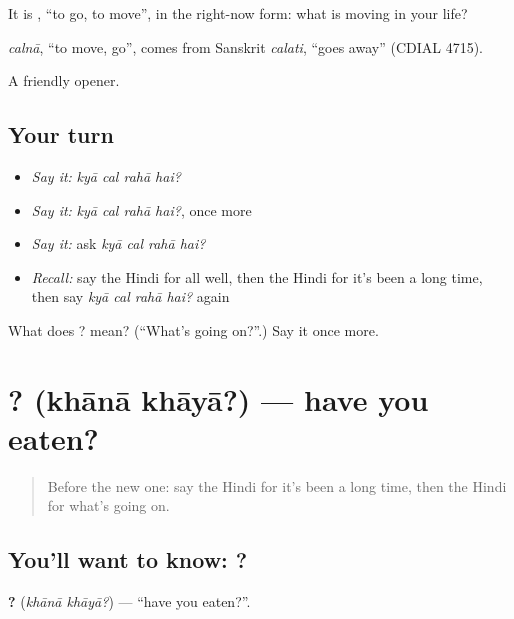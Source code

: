 It is \textbf{}, \textquotedblleft{}to go, to move\textquotedblright{}, in the right-now form: what is moving in your life?

\begin{cousinweb}
\emph{calnā}, \textquotedblleft{}to move, go\textquotedblright{}, comes from Sanskrit \emph{calati}, \textquotedblleft{}goes away\textquotedblright{} (CDIAL 4715).
\end{cousinweb}

\begin{grammarlens}[title={What you've built}]
A friendly opener.
\end{grammarlens}

\subsection*{Your turn}
\begin{itemize}
\raggedright
  \item \emph{Say it:} \emph{kyā cal rahā hai?}
  \item \emph{Say it:} \emph{kyā cal rahā hai?}, once more
  \item \emph{Say it:} ask \emph{kyā cal rahā hai?}
  \item \emph{Recall:} say the Hindi for all well, then the Hindi for it's been a long time, then say \emph{kyā cal rahā hai?} again
\end{itemize}

\begin{tcolorbox}[breakable,colback=teal!4,colframe=teal!35!black,title={Before you move on}]
What does    ? mean? (\textquotedblleft{}What's going on?\textquotedblright{}.) Say it once more.
\end{tcolorbox}
\section[\texorpdfstring{\hi{खाना} \hi{खाया}? (khānā khāyā?)}{खाना खाया? (khānā khāyā?)}]{ ? (khānā khāyā?) — have you eaten?}

\label{lesson:HI-C123-khanakhaya}



\begin{quote}
Before the new one: say the Hindi for it's been a long time, then the Hindi for what's going on.
\end{quote}

\subsection*{You'll want to know:  ?}
\textbf{ ?} (\emph{khānā khāyā?}) — \textquotedblleft{}have you eaten?\textquotedblright{}.


